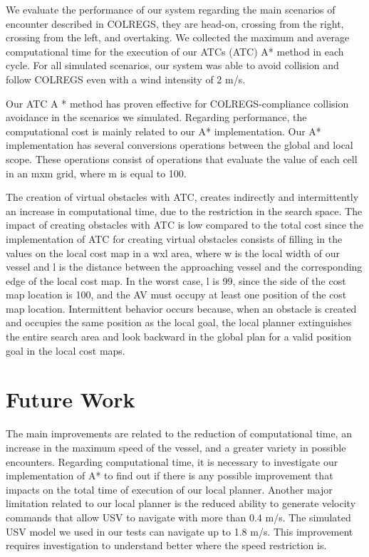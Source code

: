     We evaluate the performance of our system regarding the main scenarios of encounter described in \ac{COLREGS}, they are head-on, crossing from the right, crossing from the left, and overtaking. We collected the maximum and average computational time for the execution of our \aclp{ATC} (\ac{ATC}) A* method in each cycle. For all simulated scenarios, our system was able to avoid collision and follow \ac{COLREGS} even with a wind intensity of 2 m/s.

    Our \ac{ATC} A * method has proven effective for \ac{COLREGS}-compliance collision avoidance in the scenarios we simulated. Regarding performance, the computational cost is mainly related to our A* implementation. Our A* implementation has several conversions operations between the global and local scope. These operations consist of operations that evaluate the value of each cell in an mxm grid, where m is equal to 100.
    
    The creation of virtual obstacles with \ac{ATC}, creates indirectly and intermittently an increase in computational time, due to the restriction in the search space. The impact of creating obstacles with \ac{ATC} is low compared to the total cost since the implementation of \ac{ATC} for creating virtual obstacles consists of filling in the values on the local cost map in a wxl area, where w is the local width of our vessel and l  is the distance between the approaching vessel and the corresponding edge of the local cost map. In the worst case, l is 99, since the side of the cost map location is 100, and the \ac{AV} must occupy at least one position of the cost map location. Intermittent behavior occurs because, when an obstacle is created and occupies the same position as the local goal, the local planner extinguishes the entire search area and look backward in the global plan for a valid position goal in the local cost maps.
    
    \section{Future Work}
    
    The main improvements are related to the reduction of computational time, an increase in the maximum speed of the vessel, and a greater variety in possible encounters. Regarding computational time, it is necessary to investigate our implementation of A* to find out if there is any possible improvement that impacts on the total time of execution of our local planner. Another major limitation related to our local planner is the reduced ability to generate velocity commands that allow \ac{USV} to navigate with more than 0.4 m/s. The simulated \ac{USV} model we used in our tests can navigate up to 1.8 m/s. This improvement requires investigation to understand better where the speed restriction is.
    
